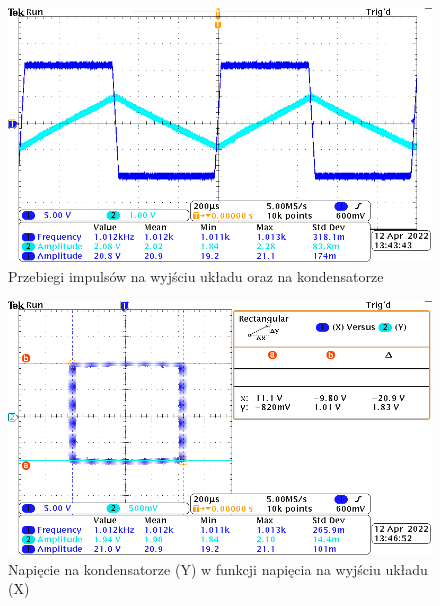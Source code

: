 \begin{figure}[H]
    \centering
    \includegraphics[width=\textwidth]{include/5/1.png}
    \caption{Przebiegi impulsów na wyjściu układu oraz na kondensatorze}
\end{figure}

\begin{figure}[H]
    \centering
    \includegraphics[width=\textwidth]{include/5/2.png}
    \caption{Napięcie na kondensatorze (Y) w funkcji napięcia na wyjściu układu (X)}
\end{figure}
